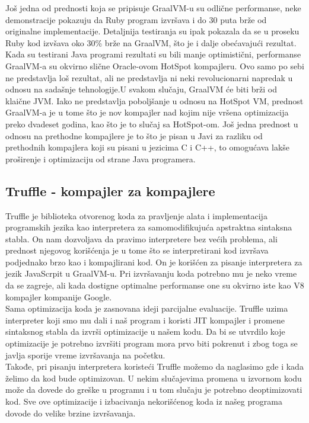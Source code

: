 \documentclass[a4paper]{article}
\begin{document}
Još jedna od prednosti koja se pripisuje GraalVM-u su odlične performanse, neke demonstracije pokazuju da Ruby program izvršava i do 30 puta brže od originalne implementacije.
Detaljnija testiranja su ipak pokazala da se u proseku Ruby kod izvšava oko 30\%  brže na GraalVM, što je i dalje obećavajući rezultat. \\

Kada su testirani Java programi rezultati su bili manje optimistični, performanse GraalVM-a su okvirno slične Oracle-ovom HotSpot kompajleru. Ovo samo po sebi ne predstavlja loš rezultat, ali ne predstavlja ni neki revolucionarni napredak u odnosu na sadašnje tehnologije.U svakom slučaju, GraalVM će biti brži od klaične JVM. Iako ne predstavlja poboljšanje u odnosu na HotSpot VM, prednost GraalVM-a je u tome što je nov kompajler nad kojim nije vršena optimizacija preko dvadeset godina, kao što je to slučaj sa HotSpot-om. Još jedna prednost u odnosu na prethodne kompajlere je to što je pisan u Javi za razliku od prethodnih kompajlera koji su pisani u jezicima C i C++, to omogućava lakše proširenje i optimizaciju od strane Java programera.

\subsection{Truffle - kompajler za kompajlere}
\label{Truffle - kompajler za kompajlere}

Truffle je biblioteka otvorenog koda za pravljenje alata i implementacija programskih jezika kao interpretera za samomodifikujuća apstraktna sintaksna stabla. On nam dozvoljava 
da pravimo interpretere bez većih problema, ali prednost njegovog korišćenja je u tome što se interpretirani kod izvršava podjednako brzo kao i kompajlirani kod.
On je korišćen za pisanje interpretera za jezik JavaScrpit u GraalVM-u. Pri izvršavanju koda potrebno mu je neko vreme da se zagreje, ali kada dostigne optimalne performanse
one su okvirno iste kao V8 kompajler kompanije Google. \\

Sama optimizacija koda je zasnovana ideji parcijalne evaluacije. Truffle uzima interpreter koji smo mu dali i naš program i koristi JIT kompajler i promene sintaksnog stabla da izvrši optimizacije u našem kodu. Da bi se utvrdilo koje optimizacije je potrebno izvršiti program mora prvo biti pokrenut i zbog toga se javlja sporije vreme izvršavanja na početku.\\

 Takođe, pri pisanju interpretera koristeći Truffle možemo da naglasimo gde i kada želimo da kod bude optimizovan. U nekim slučajevima promena u izvornom kodu može da dovede do greške u programu i u tom slučaju je potrebno deoptimizovati kod. Sve ove optimizacije i izbacivanja nekorišćenog koda iz našeg programa dovode do velike brzine izvršavanja. \\
\end{document}
